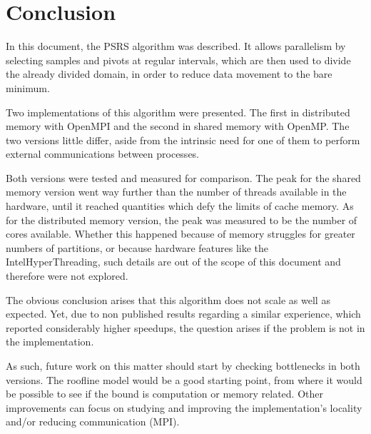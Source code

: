 \documentclass[abstract=on,9pt,twocolumn]{scrartcl}
\begin{document}
\section{Conclusion}
In this document, the PSRS algorithm was described. It allows parallelism by selecting samples and pivots at regular intervals, which are then used to divide the already divided domain, in order to reduce data movement to the bare minimum.

Two implementations of this algorithm were presented. The first in distributed memory with OpenMPI and the second in shared memory with OpenMP. The two versions little differ, aside from the intrinsic need for one of them to perform external communications between processes.

Both versions were tested and measured for comparison. The peak for the shared memory version went way further than the number of threads available in the hardware, until it reached quantities which defy the limits of cache memory. As for the distributed memory version, the peak was measured to be the number of cores available. Whether this happened because of memory struggles for greater numbers of partitions, or because hardware features like the Intel\textregistered HyperThreading, such details are out of the scope of this document and therefore were not explored.

The obvious conclusion arises that this algorithm does not scale as well as expected. Yet, due to non published results regarding a similar experience, which reported considerably higher speedups, the question arises if the problem is not in the implementation.

As such, future work on this matter should start by checking bottlenecks in both versions. The roofline model would be a good starting point, from where it would be possible to see if the bound is computation or memory related. Other improvements can focus on studying and improving the implementation's locality and/or reducing communication (MPI).






\end{document}
